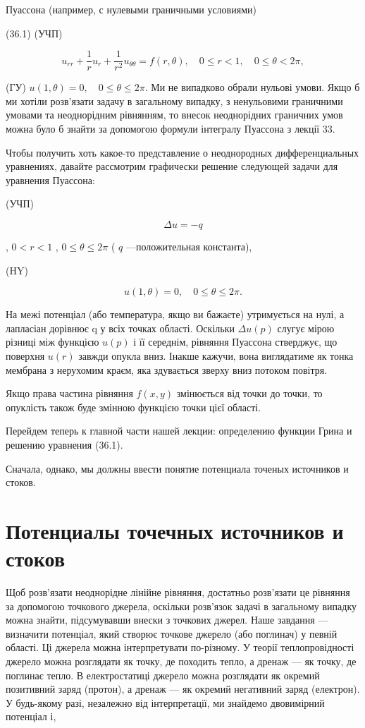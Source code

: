 \documentclass[
  ukrainian,
]{article}
\begin{document}
Пуассона (например, с нулевыми граничными условиями)

(36.1) (УЧП)

\[
u_{rr} + \frac{1}{r} u_r + \frac{1}{r^2} u_{\theta\theta} = f(r, \theta), \quad 0 \le r < 1, \quad 0 \le \theta < 2\pi,
\]

(ГУ) \(u(1, \theta) = 0, \quad 0 \le \theta \le 2\pi.\) Ми не випадково
обрали нульові умови. Якщо б ми хотіли розв'язати задачу в загальному
випадку, з ненульовими граничними умовами та неоднорідним рівнянням, то
внесок неоднорідних граничних умов можна було б знайти за допомогою
формули інтегралу Пуассона з лекції 33.

Чтобы получить хоть какое-то представление о неоднородных
дифференциальных уравнениях, давайте рассмотрим графически решение
следующей задачи для уравнения Пуассона:

(УЧП)

\[
\Delta u = -q
\]

, \(0 < r < 1\) , \(0 \le \theta \le 2\pi\) ( \(q\) ---положительная
константа),

(HY)

\[
u(1, \theta) = 0, \quad 0 \le \theta \le 2\pi.
\]

На межі потенціал (або температура, якщо ви бажаєте) утримується на
нулі, а лапласіан дорівнює q у всіх точках області. Оскільки
\(\Delta u\left(p\right)\) слугує мірою різниці між функцією
\(u\left(p\right)\) і її середнім, рівняння Пуассона стверджує, що
поверхня \(u\left(r\right)\) завжди опукла вниз. Інакше кажучи, вона
виглядатиме як тонка мембрана з нерухомим краєм, яка здувається зверху
вниз потоком повітря.

Якщо права частина рівняння \(f(x, y)\) змінюється від точки до точки,
то опуклість також буде змінною функцією точки цієї області.

Перейдем теперь к главной части нашей лекции: определению функции Грина
и решению уравнения (36.1).

Сначала, однако, мы должны ввести понятие потенциала точеных источников
и стоков.

\section{Потенциалы точечных источников и
стоков}\label{ux43fux43eux442ux435ux43dux446ux438ux430ux43bux44b-ux442ux43eux447ux435ux447ux43dux44bux445-ux438ux441ux442ux43eux447ux43dux438ux43aux43eux432-ux438-ux441ux442ux43eux43aux43eux432}

Щоб розв'язати неоднорідне лінійне рівняння, достатньо розв'язати це
рівняння за допомогою точкового джерела, оскільки розв'язок задачі в
загальному випадку можна знайти, підсумувавши внески з точкових джерел.
Наше завдання --- визначити потенціал, який створює точкове джерело (або
поглинач) у певній області. Ці джерела можна інтерпретувати по-різному.
У теорії теплопровідності джерело можна розглядати як точку, де походить
тепло, а дренаж --- як точку, де поглинає тепло. В електростатиці
джерело можна розглядати як окремий позитивний заряд (протон), а дренаж
--- як окремий негативний заряд (електрон). У будь-якому разі, незалежно
від інтерпретації, ми знайдемо двовимірний потенціал і,
\end{document}
